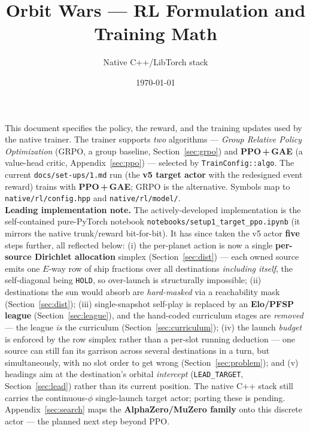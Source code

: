 \documentclass[11pt]{article}
\title{\textbf{Orbit Wars --- RL Formulation and Training Math}}
\author{Native C++/LibTorch stack}
\date{\today}
\begin{document}
\maketitle
\vspace{-1.5em}
\begin{center}\small This document specifies the policy, the reward, and the
training updates used by the native trainer. The trainer supports \emph{two}
algorithms --- \emph{Group Relative Policy Optimization} (GRPO, a group baseline,
Section~\ref{sec:grpo}) and \textbf{PPO\,+\,GAE} (a value-head critic,
Appendix~\ref{sec:ppo}) --- selected by \texttt{TrainConfig::algo}. The current
\texttt{docs/set-ups/1.md} run (the \textbf{v5 target actor} with the redesigned
event reward) trains with \textbf{PPO\,+\,GAE}; GRPO is the alternative.
Symbols map to \texttt{native/rl/config.hpp} and \texttt{native/rl/model/}.\\[0.4em]
\textbf{Leading implementation note.} The actively-developed implementation is the
self-contained pure-PyTorch notebook \texttt{notebooks/setup1\_target\_ppo.ipynb}
(it mirrors the native trunk/reward bit-for-bit). It has since taken the v5 actor
\textbf{five} steps further, all reflected below: (i) the per-planet action is now a
single \textbf{per-source Dirichlet allocation} simplex (Section~\ref{sec:dist}) --- each owned source
emits one $E$-way row of ship fractions over all destinations \emph{including itself}, the
self-diagonal being \texttt{HOLD}, so over-launch is structurally impossible; (ii) destinations the
sun would absorb are \emph{hard-masked} via a reachability mask (Section~\ref{sec:dist}); (iii)
single-snapshot self-play is replaced by an \textbf{Elo/PFSP league}
(Section~\ref{sec:league}), and the hand-coded curriculum stages are \emph{removed} --- the league
\emph{is} the curriculum (Section~\ref{sec:curriculum}); (iv) the launch \emph{budget} is enforced by
the row simplex rather than a per-slot running deduction --- one source can still fan its garrison
across several destinations in a turn, but simultaneously, with no slot order to get wrong
(Section~\ref{sec:problem}); and (v) headings aim at the destination's orbital
\emph{intercept} (\texttt{LEAD\_TARGET}, Section~\ref{sec:lead}) rather than its current
position. The native C++ stack still carries the continuous-$\phi$ single-launch
target actor; porting these is pending. Appendix~\ref{sec:search} maps the
\textbf{AlphaZero/MuZero family} onto this discrete actor --- the planned next step
beyond PPO.\end{center}
\tableofcontents
\bigskip
\end{document}
